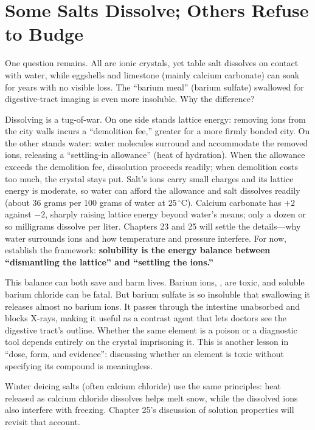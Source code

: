 \section{Some Salts Dissolve; Others Refuse to Budge}

One question remains. All are ionic crystals, yet table salt dissolves on contact with water, while eggshells and limestone (mainly calcium carbonate) can soak for years with no visible loss. The ``barium meal'' (barium sulfate) swallowed for digestive-tract imaging is even more insoluble. Why the difference?

Dissolving is a tug-of-war. On one side stands lattice energy: removing ions from the city walls incurs a ``demolition fee,'' greater for a more firmly bonded city. On the other stands water: water molecules surround and accommodate the removed ions, releasing a ``settling-in allowance'' (heat of hydration). When the allowance exceeds the demolition fee, dissolution proceeds readily; when demolition costs too much, the crystal stays put. Salt's ions carry small charges and its lattice energy is moderate, so water can afford the allowance and salt dissolves readily (about 36 grams per 100 grams of water at $25\,^{\circ}\mathrm{C}$). Calcium carbonate has $+2$ against $-2$, sharply raising lattice energy beyond water's means; only a dozen or so milligrams dissolve per liter. Chapters 23 and 25 will settle the details---why water surrounds ions and how temperature and pressure interfere. For now, establish the framework: \textbf{solubility is the energy balance between ``dismantling the lattice'' and ``settling the ions.''}

This balance can both save and harm lives. Barium ions, , are toxic, and soluble barium chloride can be fatal. But barium sulfate is so insoluble that swallowing it releases almost no barium ions. It passes through the intestine unabsorbed and blocks X-rays, making it useful as a contrast agent that lets doctors see the digestive tract's outline. Whether the same element is a poison or a diagnostic tool depends entirely on the crystal imprisoning it. This is another lesson in ``dose, form, and evidence'': discussing whether an element is toxic without specifying its compound is meaningless.

Winter deicing salts (often calcium chloride) use the same principles: heat released as calcium chloride dissolves helps melt snow, while the dissolved ions also interfere with freezing. Chapter 25's discussion of solution properties will revisit that account.

